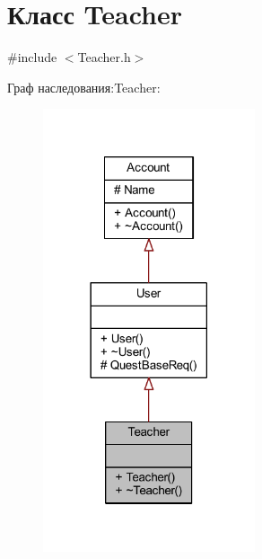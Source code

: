\hypertarget{class_teacher}{}\section{Класс Teacher}
\label{class_teacher}


{\ttfamily \#include $<$Teacher.\+h$>$}



Граф наследования\+:Teacher\+:\nopagebreak
\begin{figure}[H]
\begin{center}
\leavevmode
\includegraphics[width=177pt]{d7/d13/class_teacher__inherit__graph}
\end{center}
\end{figure}


